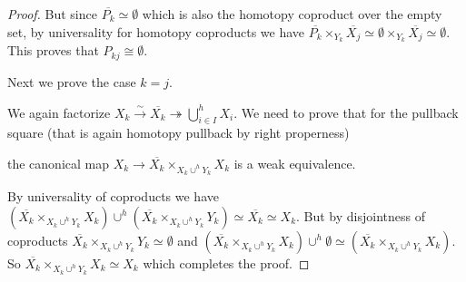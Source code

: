 \begin{corollary}
\begin{proof}
        But since $\overline{P_{k}}\simeq\emptyset$ which is also the homotopy coproduct over the empty set, by universality for homotopy coproducts we have $\overline{P_k}\times_{Y_k}\overline{X_j}\simeq\emptyset\times_{Y_k}\overline{X_j}\simeq\emptyset$.
        This proves that $P_{kj}\cong\emptyset$.

        Next we prove the case $k=j$. 

        We again factorize $X_k\xrightarrow{\sim}\overline{X_k}\twoheadrightarrow\bigcup\limits_{i\in I}^h X_i$.
        We need to prove that for the pullback square (that is again homotopy pullback by right properness)
        \begin{center}
        \end{center}
        the canonical map $X_k\to\overline{X_k}\times_{X_k\cup^h Y_k}X_k$ is a weak equivalence.

        By universality of coproducts we have $\left(\overline{X_k}\times_{X_k\cup^h Y_k}X_k\right)\cup^h\left(\overline{X_k}\times_{X_k\cup^h Y_k}Y_k\right)\simeq \overline{X_k}\simeq X_k$.
        But by disjointness of coproducts $\overline{X_k}\times_{X_k\cup^h Y_k}Y_k\simeq\emptyset$ and $\left(\overline{X_k}\times_{X_k\cup^h Y_k}X_k\right)\cup^h\emptyset\simeq\left(\overline{X_k}\times_{X_k\cup^h Y_k}X_k\right)$.
        So $\overline{X_k}\times_{X_k\cup^h Y_k}X_k\simeq X_k$ which completes the proof.
    \end{proof}
\end{corollary}
